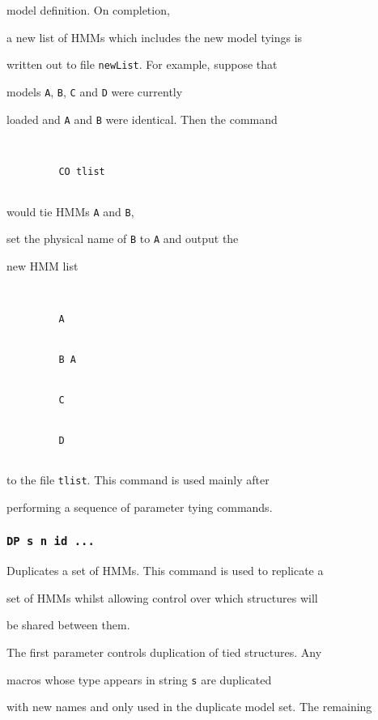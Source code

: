 model definition.  On completion,


a new list of HMMs which includes the new model tyings is


written out to file \texttt{newList}.  For example, suppose that


models \texttt{A}, \texttt{B}, \texttt{C} and \texttt{D} were currently


loaded and \texttt{A} and \texttt{B} were identical.  Then the command


\begin{verbatim}


         CO tlist


\end{verbatim}


would tie HMMs \texttt{A} and \texttt{B}, 


set the physical name of \texttt{B} to \texttt{A} and output the


new HMM list


\begin{verbatim}


         A


         B A


         C


         D


\end{verbatim}


to the file \texttt{tlist}.  This command is used mainly after 


performing a sequence of parameter tying commands.





\subsubsection*{\tt DP s n id ...}





Duplicates a set of HMMs.  This command is used to replicate a


set of HMMs whilst allowing control over which structures will


be shared between them.


The first parameter controls duplication of tied structures.  Any


macros whose type appears in string \texttt{s} are duplicated


with new names and only used in the duplicate model set.  The remaining



